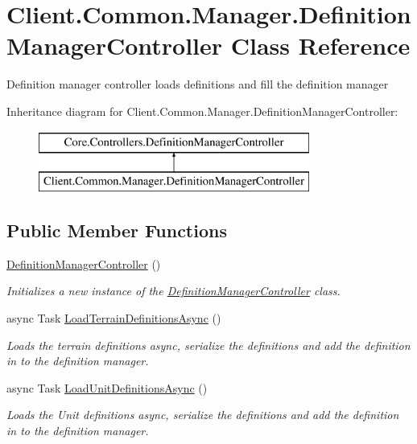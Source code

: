 \hypertarget{classClient_1_1Common_1_1Manager_1_1DefinitionManagerController}{}\section{Client.\+Common.\+Manager.\+Definition\+Manager\+Controller Class Reference}
\label{classClient_1_1Common_1_1Manager_1_1DefinitionManagerController}


Definition manager controller loads definitions and fill the definition manager  


Inheritance diagram for Client.\+Common.\+Manager.\+Definition\+Manager\+Controller\+:\begin{figure}[H]
\begin{center}
\leavevmode
\includegraphics[height=2.000000cm]{classClient_1_1Common_1_1Manager_1_1DefinitionManagerController}
\end{center}
\end{figure}
\subsection*{Public Member Functions}
\begin{DoxyCompactItemize}
\item 
\hyperlink{classClient_1_1Common_1_1Manager_1_1DefinitionManagerController_a96a7c15eea1a7237941000f9008ab808}{Definition\+Manager\+Controller} ()
\begin{DoxyCompactList}\small\item\em Initializes a new instance of the \hyperlink{classClient_1_1Common_1_1Manager_1_1DefinitionManagerController}{Definition\+Manager\+Controller} class. \end{DoxyCompactList}\item 
async Task \hyperlink{classClient_1_1Common_1_1Manager_1_1DefinitionManagerController_aa551f263205c884e7e9255a95b3731e9}{Load\+Terrain\+Definitions\+Async} ()
\begin{DoxyCompactList}\small\item\em Loads the terrain definitions async, serialize the definitions and add the definition in to the definition manager. \end{DoxyCompactList}\item 
async Task \hyperlink{classClient_1_1Common_1_1Manager_1_1DefinitionManagerController_a4a20fe19a6a0ce7b3a1525894ddade4b}{Load\+Unit\+Definitions\+Async} ()
\begin{DoxyCompactList}\small\item\em Loads the Unit definitions async, serialize the definitions and add the definition in to the definition manager. \end{DoxyCompactList}\end{DoxyCompactItemize}
